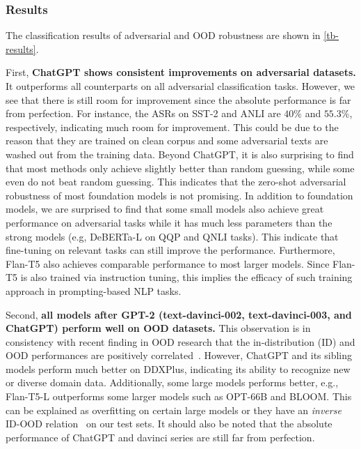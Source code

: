 \documentclass[11pt]{article}
\newcommand{\chat}{ChatGPT\xspace}
\newcommand{\ddx}{DDXPlus\xspace}
\begin{document}


\subsubsection{Results}

The classification results of adversarial and OOD robustness are shown in \cref{tb-results}.

First, \textbf{\chat shows consistent improvements on adversarial datasets.}
It outperforms all counterparts on all adversarial classification tasks.
However, we see that there is still room for improvement since the absolute performance is far from perfection.
For instance, the ASRs on SST-2 and ANLI are $40\%$ and $55.3\%$, respectively, indicating much room for improvement. 
This could be due to the reason that they are trained on clean corpus and some adversarial texts are washed out from the training data.
Beyond \chat, it is also surprising to find that most methods only achieve slightly better than random guessing, while some even do not beat random guessing.
This indicates that the zero-shot adversarial robustness of most foundation models is not promising.
In addition to foundation models, we are surprised to find that some small models also achieve great performance on adversarial tasks while it has much less parameters than the strong models (e.g, DeBERTa-L on QQP and QNLI tasks).
This indicate that fine-tuning on relevant tasks can still improve the performance.
Furthermore, Flan-T5 also achieves comparable performance to most larger models.
Since Flan-T5 is also trained via instruction tuning, this implies the efficacy of such training approach in prompting-based NLP tasks.

Second, \textbf{all models after GPT-2 (text-davinci-002, text-davinci-003, and \chat) perform well on OOD datasets.}
This observation is in consistency with recent finding in OOD research that the in-distribution (ID) and OOD performances are positively correlated~\cite{miller2021accuracy}.
However, \chat and its sibling models perform much better on \ddx, indicating its ability to recognize new or diverse domain data.
Additionally, some large models performs better, e.g., Flan-T5-L outperforms some larger models such as OPT-66B and BLOOM.
This can be explained as overfitting on certain large models or they have an \emph{inverse} ID-OOD relation~\cite{teney2022id} on our test sets.
It should also be noted that the absolute performance of \chat and davinci series are still far from perfection.
\end{document}

